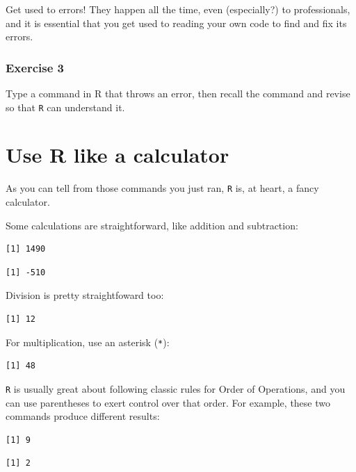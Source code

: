 \documentclass[
]{book}
\begin{document}
Get used to errors! They happen all the time, even (especially?) to professionals, and it is essential that you get used to reading your own code to find and fix its errors.

\hypertarget{exercise-3}{%
\subsubsection*{Exercise 3}\label{exercise-3}}

Type a command in R that throws an error, then recall the command and revise so that \texttt{R} can understand it.

\hypertarget{use-r-like-a-calculator}{%
\section*{Use R like a calculator}\label{use-r-like-a-calculator}}

As you can tell from those commands you just ran, \texttt{R} is, at heart, a fancy calculator.

Some calculations are straightforward, like addition and subtraction:

\begin{verbatim}
[1] 1490
\end{verbatim}

\begin{verbatim}
[1] -510
\end{verbatim}

Division is pretty straightfoward too:

\begin{verbatim}
[1] 12
\end{verbatim}

For multiplication, use an asterisk (\texttt{*}):

\begin{verbatim}
[1] 48
\end{verbatim}

\texttt{R} is usually great about following classic rules for Order of Operations, and you can use parentheses to exert control over that order. For example, these two commands produce different results:

\begin{verbatim}
[1] 9
\end{verbatim}

\begin{verbatim}
[1] 2
\end{verbatim}
\end{document}
